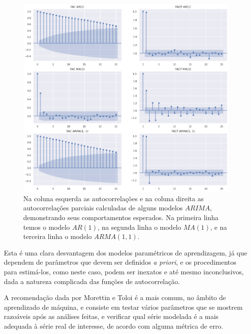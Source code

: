 \begin{figure}[htb]
\centering
\includegraphics[width=14cm]{figuras/parciais}
\caption{Na coluna esquerda as autocorrelações e na coluna direita as autocorrelações parciais calculadas de alguns modelos $ARIMA$, demonstrando seus comportamentos esperados. Na primeira linha temos o modelo $AR(1)$, na segunda linha o modelo $MA(1)$, e na terceira linha o modelo $ARMA(1,1)$.}
\label{fig:parciais}
\end{figure}

Esta é uma clara desvantagem dos modelos paramétricos de aprendizagem, já que dependem de parâmetros que devem ser definidos \emph{a priori}, e os procedimentos para estimá-los, como neste caso, podem ser inexatos e até mesmo inconclusivos, dada a natureza complicada das funções de autocorrelação.

A recomendação dada por Morettin e Toloi \citep{morettin} é a mais comum, no âmbito de aprendizado de máquina, e consiste em testar vários parâmetros que se mostrem razoáveis após as análises feitas, e verificar qual série modelada é a mais adequada à série real de interesse, de acordo com alguma métrica de erro.
